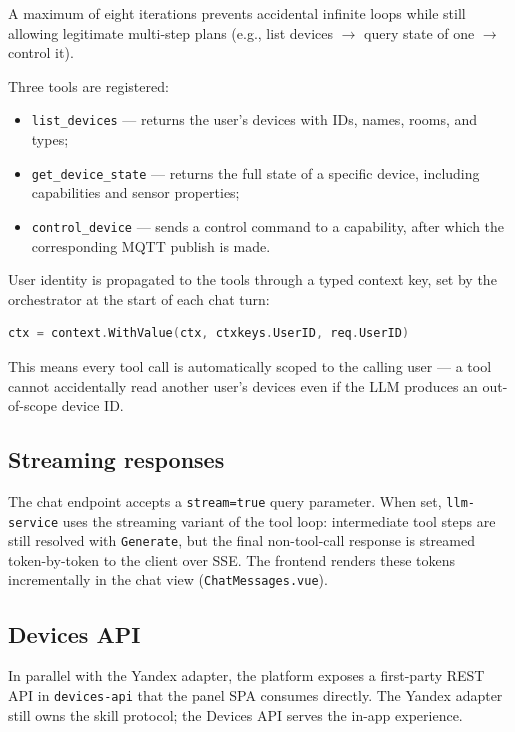 \documentclass[a4paper,12pt]{article}
\begin{document}
A maximum of eight iterations prevents accidental infinite loops while still allowing legitimate multi-step plans (e.g., list devices $\to$ query state of one $\to$ control it).

Three tools are registered:

\begin{itemize}
  \item \verb|list_devices| --- returns the user's devices with IDs, names, rooms, and types;
  \item \verb|get_device_state| --- returns the full state of a specific device, including capabilities and sensor properties;
  \item \verb|control_device| --- sends a control command to a capability, after which the corresponding MQTT publish is made.
\end{itemize}

User identity is propagated to the tools through a typed context key, set by the orchestrator at the start of each chat turn:

\begin{lstlisting}[language=Go]
ctx = context.WithValue(ctx, ctxkeys.UserID, req.UserID)
\end{lstlisting}

This means every tool call is automatically scoped to the calling user --- a tool cannot accidentally read another user's devices even if the LLM produces an out-of-scope device ID.

\subsection{Streaming responses}

The chat endpoint accepts a \verb|stream=true| query parameter. When set, \verb|llm-service| uses the streaming variant of the tool loop: intermediate tool steps are still resolved with \verb|Generate|, but the final non-tool-call response is streamed token-by-token to the client over SSE. The frontend renders these tokens incrementally in the chat view (\verb|ChatMessages.vue|).

\subsection{Devices API}

In parallel with the Yandex adapter, the platform exposes a first-party REST API in \verb|devices-api| that the panel SPA consumes directly. The Yandex adapter still owns the skill protocol; the Devices API serves the in-app experience.
\end{document}
